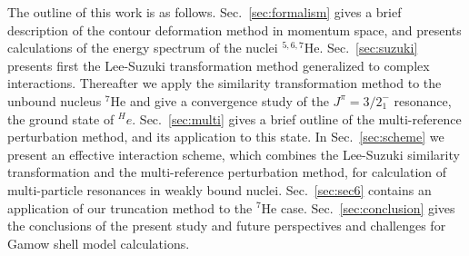 The outline of this work is as follows. Sec.~\ref{sec:formalism} gives a brief
description of the contour deformation method in momentum space, 
and presents calculations
of the energy spectrum of the nuclei $^{5,6,7}$He. 
Sec.~\ref{sec:suzuki} presents first the 
Lee-Suzuki transformation method generalized to complex interactions. Thereafter we
apply the similarity transformation method to the unbound nucleus $^7$He and give a 
convergence study of the $J^\pi=3/2^-_{1}$ resonance, the ground state of $^He$. 
Sec.~\ref{sec:multi} gives a brief
outline of the multi-reference perturbation method, 
and its application to this state. In Sec.~\ref{sec:scheme} we present 
an effective interaction scheme, which combines 
the Lee-Suzuki similarity transformation and the multi-reference perturbation method, 
for calculation of 
multi-particle resonances in weakly bound nuclei. Sec.~\ref{sec:sec6} contains an
application of our truncation method to the $^7$He case.
Sec.~\ref{sec:conclusion} 
gives the conclusions of the present study and 
future perspectives and challenges for 
Gamow shell model calculations.


